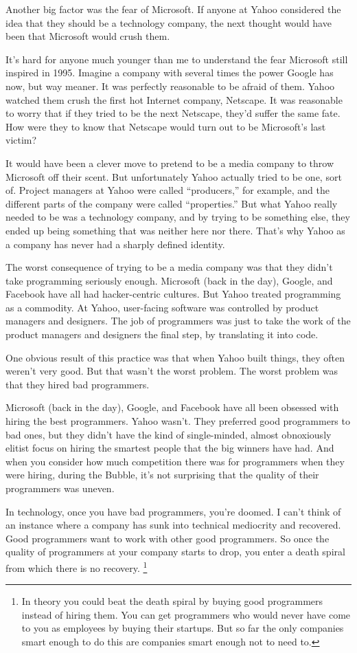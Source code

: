 \documentclass[12pt]{book}
\begin{document}
Another big factor was the fear of Microsoft. If anyone at Yahoo
considered the idea that they should be a technology company, the next
thought would have been that Microsoft would crush them.

It's hard for anyone much younger than me to understand the fear
Microsoft still inspired in 1995. Imagine a company with several times
the power Google has now, but way meaner. It was perfectly reasonable to
be afraid of them. Yahoo watched them crush the first hot Internet
company, Netscape. It was reasonable to worry that if they tried to be
the next Netscape, they'd suffer the same fate. How were they to know
that Netscape would turn out to be Microsoft's last victim?

It would have been a clever move to pretend to be a media company to
throw Microsoft off their scent. But unfortunately Yahoo actually tried
to be one, sort of. Project managers at Yahoo were called ``producers,''
for example, and the different parts of the company were called
``properties.'' But what Yahoo really needed to be was a technology
company, and by trying to be something else, they ended up being
something that was neither here nor there. That's why Yahoo as a company
has never had a sharply defined identity.

The worst consequence of trying to be a media company was that they
didn't take programming seriously enough. Microsoft (back in the day),
Google, and Facebook have all had hacker-centric cultures. But Yahoo
treated programming as a commodity. At Yahoo, user-facing software was
controlled by product managers and designers. The job of programmers was
just to take the work of the product managers and designers the final
step, by translating it into code.

One obvious result of this practice was that when Yahoo built things,
they often weren't very good. But that wasn't the worst problem. The
worst problem was that they hired bad programmers.

Microsoft (back in the day), Google, and Facebook have all been obsessed
with hiring the best programmers. Yahoo wasn't. They preferred good
programmers to bad ones, but they didn't have the kind of single-minded,
almost obnoxiously elitist focus on hiring the smartest people that the
big winners have had. And when you consider how much competition there
was for programmers when they were hiring, during the Bubble, it's not
surprising that the quality of their programmers was uneven.

In technology, once you have bad programmers, you're doomed. I can't
think of an instance where a company has sunk into technical mediocrity
and recovered. Good programmers want to work with other good
programmers. So once the quality of programmers at your company starts
to drop, you enter a death spiral from which there is no recovery.
\footnote{In theory you could beat the death spiral by buying good
programmers instead of hiring them. You can get programmers who would
never have come to you as employees by buying their startups. But so far
the only companies smart enough to do this are companies smart enough
not to need to.}
\end{document}
